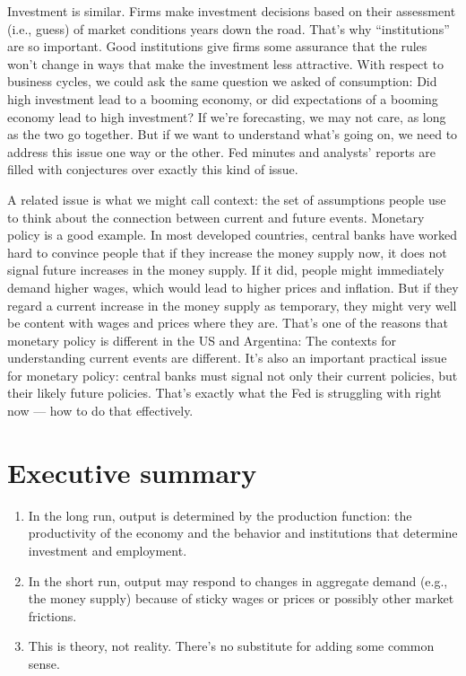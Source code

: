 Investment is similar.  Firms make investment decisions
based on their assessment (i.e., guess)
of market conditions years down the road.
That's why ``institutions'' are so important. Good institutions give firms some assurance that the rules won't change
in ways that make the investment less attractive.
With respect to business cycles, we could ask the same question
we asked of consumption: Did high investment lead to a booming economy,
or did expectations of a booming economy lead to high investment?
If we're forecasting, we may not care, as long as the two go
together.
But if we want to understand what's going on, we need to address
this issue one way or the other.
Fed minutes and analysts' reports
are filled with conjectures over exactly this kind of issue.

A related issue is what we might call context:
the set of assumptions people use to think about
the connection between current and future events.
Monetary policy is a good example.
In most developed countries,
central banks  have worked hard to convince people
that if they increase the money supply now,
it does not signal future increases in the money supply.
If it did, people might immediately demand higher wages,
which would lead to higher prices and inflation.
But if they regard a current increase in the money supply as temporary,
they might very well be content with wages and prices
where they are.
That's one of the reasons that monetary policy is different
in the US and Argentina:
The contexts for understanding current events are different.
It's also an important practical issue for monetary policy: central banks  must signal not only their current policies,
but their likely future policies.
That's exactly what the Fed is struggling with right now --- how to do that effectively.




\section*{Executive summary}

\setlength{\leftmargini}{.5\oldleftmargini}
\begin{enumerate}
\item In the long run, output is determined by the production function:
the productivity of the economy and the behavior and institutions
that determine investment and employment.

\item In the short run, output may respond to changes in
aggregate demand (e.g., the money supply) because of sticky wages or prices
or possibly other market frictions.

\item This is theory, not reality.
There's no substitute for adding some common sense.
\end{enumerate}
\setlength{\leftmargini}{\oldleftmargini}

